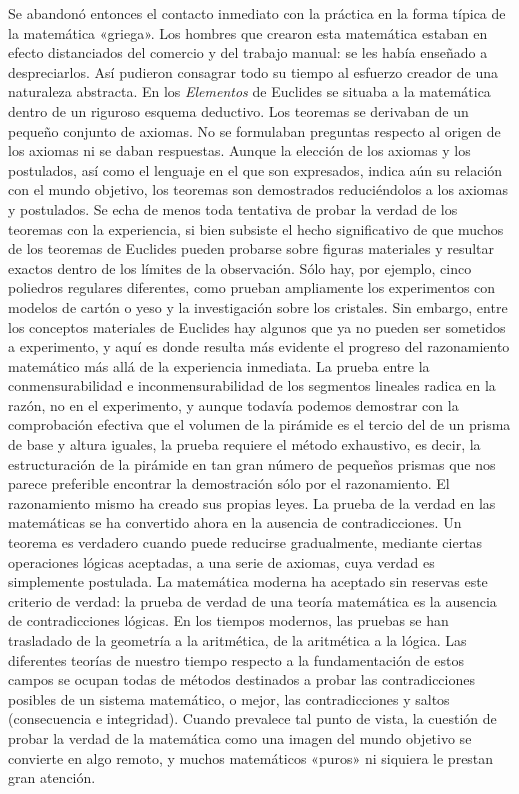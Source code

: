 \documentclass[a4paper, 12pt]{article}
\begin{document}
Se abandonó entonces el contacto inmediato con la práctica en la forma típica de
la matemática «griega». Los hombres que crearon esta matemática estaban en
efecto distanciados del comercio y del trabajo manual: se les había enseñado a
despreciarlos. Así pudieron consagrar todo su tiempo al esfuerzo creador de una
naturaleza abstracta. En los \textit{Elementos} de Euclides se situaba a la
matemática dentro de un riguroso esquema deductivo. Los teoremas se derivaban de
un pequeño conjunto de axiomas. No se formulaban preguntas respecto al origen de
los axiomas ni se daban respuestas. Aunque la elección de los axiomas y los
postulados, así como el lenguaje en el que son expresados, indica aún su
relación con el mundo objetivo, los teoremas son demostrados reduciéndolos a los
axiomas y postulados. Se echa de menos toda tentativa de probar la verdad de los
teoremas con la experiencia, si bien subsiste el hecho significativo de que
muchos de los teoremas de Euclides pueden probarse sobre figuras materiales y
resultar exactos dentro de los límites de la observación. Sólo hay, por ejemplo,
cinco poliedros regulares diferentes, como prueban ampliamente los experimentos
con modelos de cartón o yeso y la investigación sobre los cristales. Sin
embargo, entre los conceptos materiales de Euclides hay algunos que ya no pueden
ser sometidos a experimento, y aquí es donde resulta más evidente el progreso
del razonamiento matemático más allá de la experiencia inmediata. La prueba
entre la conmensurabilidad e inconmensurabilidad de los segmentos lineales
radica en la razón, no en el experimento, y aunque todavía podemos demostrar con
la comprobación efectiva que el volumen de la pirámide es el tercio del de un
prisma de base y altura iguales, la prueba requiere el método exhaustivo, es
decir, la estructuración de la pirámide en tan gran número de pequeños prismas
que nos parece preferible encontrar la demostración sólo por el razonamiento. El
razonamiento mismo ha creado sus propias leyes. La prueba de la verdad en las
matemáticas se ha convertido ahora en la ausencia de contradicciones. Un teorema
es verdadero cuando puede reducirse gradualmente, mediante ciertas operaciones
lógicas aceptadas, a una serie de axiomas, cuya verdad es simplemente postulada.
La matemática moderna ha aceptado sin reservas este criterio de verdad: la
prueba de verdad de una teoría matemática es la ausencia de contradicciones
lógicas. En los tiempos modernos, las pruebas se han trasladado de la geometría
a la aritmética, de la aritmética a la lógica. Las diferentes teorías de nuestro
tiempo respecto a la fundamentación de estos campos se ocupan todas de métodos
destinados a probar las contradicciones posibles de un sistema matemático, o
mejor, las contradicciones y saltos (consecuencia e integridad). Cuando
prevalece tal punto de vista, la cuestión de probar la verdad de la matemática
como una imagen del mundo objetivo se convierte en algo remoto, y muchos
matemáticos «puros» ni siquiera le prestan gran atención.
\end{document}
